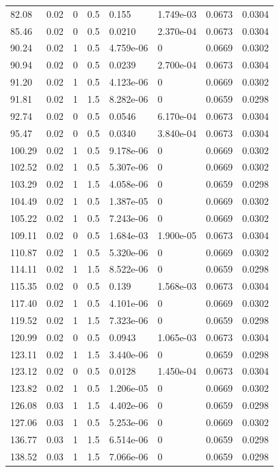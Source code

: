 \documentclass[preview]{standalone}
\begin{document}
{{\begin{tabular}{L{1.2cm}C{1.2cm} C{0.3cm}C{0.5cm} C{1.4cm}C{1.4cm} C{1.4cm}C{1.4cm}}
  82.08  &  0.02  & 0     & 0.5 &  0.155  & 1.749e-03  & 0.0673 &  0.0304   \\ 
  85.46  &  0.02  & 0     & 0.5 &  0.0210  & 2.370e-04  & 0.0673 &  0.0304   \\ 
  90.24  &  0.02  & 1     & 0.5 &  4.759e-06  & 0  & 0.0669 &  0.0302   \\ 
  90.94  &  0.02  & 0     & 0.5 &  0.0239  & 2.700e-04  & 0.0673 &  0.0304   \\ 
  91.20  &  0.02  & 1     & 0.5 &  4.123e-06  & 0  & 0.0669 &  0.0302   \\ 
  91.81  &  0.02  & 1     & 1.5 &  8.282e-06  & 0  & 0.0659 &  0.0298   \\ 
  92.74  &  0.02  & 0     & 0.5 &  0.0546  & 6.170e-04  & 0.0673 &  0.0304   \\ 
  95.47  &  0.02  & 0     & 0.5 &  0.0340  & 3.840e-04  & 0.0673 &  0.0304   \\ 
  100.29  &  0.02  & 1     & 0.5 &  9.178e-06  & 0  & 0.0669 &  0.0302   \\ 
  102.52  &  0.02  & 1     & 0.5 &  5.307e-06  & 0  & 0.0669 &  0.0302   \\ 
  103.29  &  0.02  & 1     & 1.5 &  4.058e-06  & 0  & 0.0659 &  0.0298   \\ 
  104.49  &  0.02  & 1     & 0.5 &  1.387e-05  & 0  & 0.0669 &  0.0302   \\ 
  105.22  &  0.02  & 1     & 0.5 &  7.243e-06  & 0  & 0.0669 &  0.0302   \\ 
  109.11  &  0.02  & 0     & 0.5 &  1.684e-03  & 1.900e-05  & 0.0673 &  0.0304   \\ 
  110.87  &  0.02  & 1     & 0.5 &  5.320e-06  & 0  & 0.0669 &  0.0302   \\ 
  114.11  &  0.02  & 1     & 1.5 &  8.522e-06  & 0  & 0.0659 &  0.0298   \\ 
  115.35  &  0.02  & 0     & 0.5 &  0.139  & 1.568e-03  & 0.0673 &  0.0304   \\ 
  117.40  &  0.02  & 1     & 0.5 &  4.101e-06  & 0  & 0.0669 &  0.0302   \\ 
  119.52  &  0.02  & 1     & 1.5 &  7.323e-06  & 0  & 0.0659 &  0.0298   \\ 
  120.99  &  0.02  & 0     & 0.5 &  0.0943  & 1.065e-03  & 0.0673 &  0.0304   \\ 
  123.11  &  0.02  & 1     & 1.5 &  3.440e-06  & 0  & 0.0659 &  0.0298   \\ 
  123.12  &  0.02  & 0     & 0.5 &  0.0128  & 1.450e-04  & 0.0673 &  0.0304   \\ 
  123.82  &  0.02  & 1     & 0.5 &  1.206e-05  & 0  & 0.0669 &  0.0302   \\ 
  126.08  &  0.03  & 1     & 1.5 &  4.402e-06  & 0  & 0.0659 &  0.0298   \\ 
  127.06  &  0.03  & 1     & 0.5 &  5.253e-06  & 0  & 0.0669 &  0.0302   \\ 
  136.77  &  0.03  & 1     & 1.5 &  6.514e-06  & 0  & 0.0659 &  0.0298   \\ 
  138.52  &  0.03  & 1     & 1.5 &  7.066e-06  & 0  & 0.0659 &  0.0298   \\ 
\hline 
\end{tabular} 

}}
\end{document}
